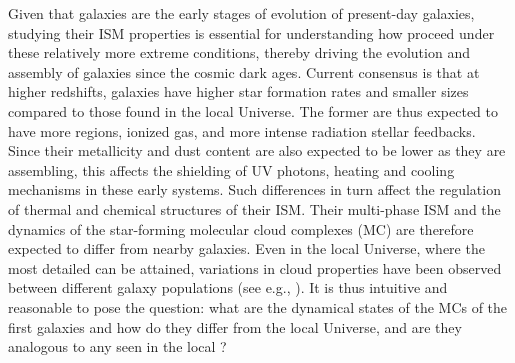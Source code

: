 \IfFileExists{emulateapjlegacy.cls}{\documentclass[iop]{emulateapjlegacy}}{\documentclass[iop]{emulateapj}}
\begin{document}
Given that \highz galaxies are the early stages of evolution of present-day galaxies, studying their ISM properties is essential for understanding how \SF proceed under these relatively more extreme conditions, thereby driving the evolution and assembly
of galaxies
since the cosmic dark ages.
Current consensus is that at higher redshifts, galaxies have higher
star formation rates \citep[SFR; ][]{Behroozi13b, Sparre15a, Maiolino15a, Dunlop17a} and
smaller sizes \citep[e.g.,][]{Bouwens11a, Ono13a} compared to those found in the local Universe.
The former are thus expected to have more  regions, ionized gas, and more intense radiation stellar feedbacks.
Since their metallicity and dust content are also expected to be lower as they are assembling,
this affects the shielding of UV photons, heating and cooling mechanisms in these early systems. Such differences in turn
affect the regulation of thermal and chemical structures of their ISM.
Their multi-phase ISM and the dynamics of the star-forming molecular cloud complexes (MC)
are therefore expected to differ from nearby galaxies.
Even in the local Universe, where the most detailed \obs can be attained, variations in cloud properties have been
observed between different galaxy populations (see e.g., \citealt{Hughes10a, Hughes13b}).
It is thus intuitive and reasonable to pose the question: what are the dynamical states of the MCs of the first galaxies and
how do they differ from the local Universe, and are they analogous to any seen in the local \galpop?
%
\end{document}
